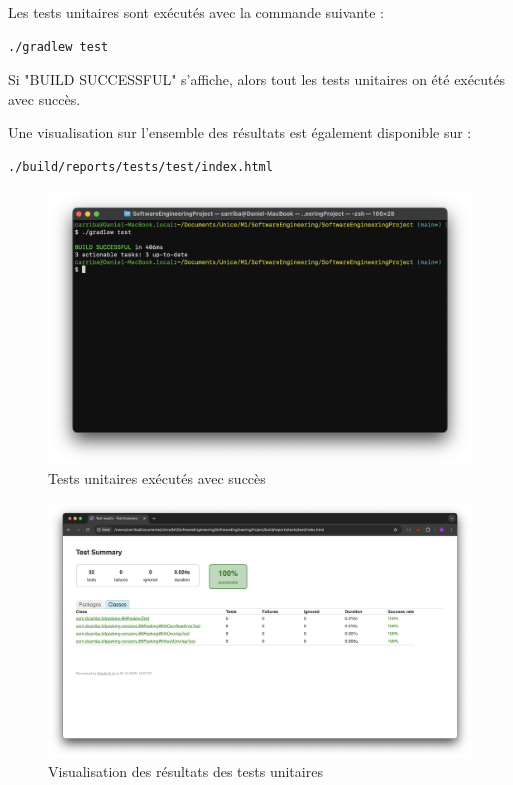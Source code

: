 \documentclass[titlepage]{article}
\begin{document}
Les tests unitaires sont exécutés avec la commande suivante :
\begin{lstlisting}[language=Bash]
./gradlew test
\end{lstlisting}
Si "BUILD SUCCESSFUL" s'affiche, alors tout les tests unitaires on été exécutés avec succès.
\par Une visualisation sur l'ensemble des résultats est également disponible sur :
\begin{lstlisting}[language=Bash]
./build/reports/tests/test/index.html
\end{lstlisting}
\begin{figure}[h!]
    \centering
    \includegraphics[width=1\textwidth]{img/unitTestsTerminal.png}
    \caption{Tests unitaires exécutés avec succès}
    \label{fig:unitTestsTerminal}
\end{figure}
\begin{figure}[h!]
    \centering
    \includegraphics[width=1\textwidth]{img/unitTestsResults.png}
    \caption{Visualisation des résultats des tests unitaires}
    \label{fig:unitTestsResults}
\end{figure}
\end{document}
